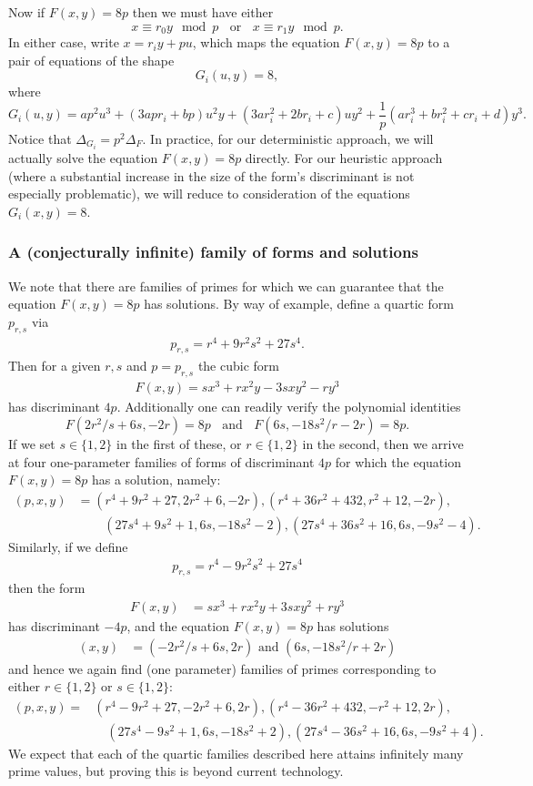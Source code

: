 Now if $F(x,y)=8p$ then we must have either
$$
 x \equiv r_0 y \mod{p} \; \; \mbox{ or } \; \; 
 x \equiv r_1 y \mod{p}.
$$
In either case, write $x=r_i y + p u$, which maps the equation $F(x,y)=8p$ to a pair of equations of the shape
$$
G_i(u,y) = 8,
$$
where
$$
G_i(u,y) = ap^2 u^3 + (3 a p r_i + bp) u^2 y + (3 a r_i^2 + 2 b r_i + c) u y^2 + \frac{1}{p} (a r_i^3 + b r_i^2 + c 
r_i + d) y^3.
$$
Notice that $\Delta_{G_i}= p^2 \Delta_F$. In practice, for our deterministic approach, we will actually solve the 
equation $F(x,y)=8p$ directly. For our heuristic approach (where a substantial increase in the size of the form's 
discriminant is not especially problematic), we will reduce to consideration of the equations 
$G_i(x,y)=8$.

\subsubsection{A (conjecturally infinite) family of forms and solutions}
We note that there are families of primes for which we can guarantee that the equation $F(x,y)=8p$ has solutions. By way of
example, define a quartic form $p_{r,s}$ via
\begin{align*}
p_{r,s}=r^4+9 r^2 s^2 + 27 s^4.
\end{align*}
Then for a given $r,s$ and $p=p_{r,s}$ the cubic form 
\begin{align*}
F(x,y) = s x^3 + r x^2 y - 3 s x y^2 -r y^3
\end{align*}
has discriminant $4 p$. Additionally one can readily verify the polynomial identities
$$
F(2r^2/s+6s,-2r) = 8p \; \; \mbox{ and } \; \;  F(6s,-18s^2/r-2r) = 8p.
$$
If we set $s \in \{ 1, 2 \}$ in the first of these, or $r \in \{ 1, 2 \}$ in the second, then we arrive at four one-parameter families 
of forms of discriminant $4p$ for which the equation $F(x,y)=8p$ has a solution, namely:
\begin{align*}
(p,x,y) &= (r^4+9r^2+27,2r^2+6,-2r), (r^4+36 r^2 + 432,r^2+12,-2r), \\
 &\phantom{=+}  (27 s^4+9 s^2+1,6s,-18s^2-2), (27s^4+36s^2+16,6s,-9s^2-4).
\end{align*}
Similarly, if we define 
\begin{align*}
p_{r,s}=r^4-9 r^2 s^2 + 27 s^4
\end{align*}
then the form
\begin{align*}
F(x,y) &= s x^3 + r x^2 y + 3 s x y^2 +r y^3
\end{align*}
has discriminant $-4 p$, and the equation $F(x,y)=8p$ has solutions
\begin{align*}
(x,y) &= (-2r^2/s + 6s, 2r)  \text{ and } (6s,-18s^2/r + 2r)
\end{align*}
and hence we again find  (one parameter) families  of primes corresponding to either $r\in \{ 1,2 \}$ or $s\in \{1,2 \}$:
\begin{align*}
(p,x,y)= & (r^4-9r^2+27,-2r^2+6,2r), (r^4-36 r^2 + 432,-r^2+12,2r), \\
 &\quad (27 s^4-9 s^2+1,6s,-18s^2+2), (27s^4-36s^2+16,6s,-9s^2+4).
\end{align*}
We expect that each of the quartic families described here attains infinitely many prime values, but proving this is 
beyond current technology.

